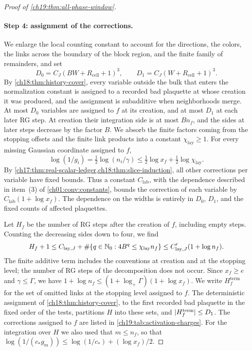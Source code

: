 \begin{proof}[Proof of \cref{ch19:thm:all-phase-window}]
\paragraph{Step 4: assignment of the corrections.}
We enlarge the local counting constant to account for the directions, the colors, the links across the boundary of the block region, and the finite family of remainders, and set
\[
 D_0=C_J(BW+R_{\mathrm{cell}}+1)^3,\qquad D_1=C_J(W+R_{\mathrm{cell}}+1)^3.
\]
By \cref{ch18:thm:history-cover}, every variable outside the bulk that enters the normalization constant is assigned to a recorded bad plaquette at whose creation it was produced, and the assignment is subadditive when neighborhoods merge. At most $D_0$ variables are assigned to $f$ at its creation, and at most $D_1$ at each later RG step. At creation their integration side is at most $Bn_f$, and the sides at later steps decrease by the factor $B$. We absorb the finite factors coming from the stopping offsets and the finite link products into a constant $\chi_{\mathrm{lay}}\ge1$. For every missing Gaussian coordinate assigned to $f$,
\begin{equation}\label{ch19:eq:label-log}
 \log(1/g_i)=\tfrac12\log(n_i/\gamma)\le\tfrac12\log x_f+\tfrac12\log\chi_{\mathrm{lay}}.
\end{equation}
By \cref{ch17:thm:real-scalar-ledger,ch18:thm:slice-induction}, all other corrections per variable have fixed bounds. Thus a constant $C_{\mathrm{lab}}$, with the dependence described in item~(3) of \cref{ch01:conv:constants}, bounds the correction of each variable by $C_{\mathrm{lab}}(1+\log x_f)$. The dependence on the widths is entirely in $D_0$, $D_1$, and the fixed counts of affected plaquettes.

Let $H_f$ be the number of RG steps after the creation of $f$, including empty steps. Counting the decreasing sides down to four, we find
\[
 H_f+1\le C_{\mathrm{lay},J}+\#\{q\in\mathbb N_0:4B^q\le\chi_{\mathrm{lay}}n_f\}\le C'_{\mathrm{lay},J}(1+\log n_f).
\]
The finite additive term includes the conventions at creation and at the stopping level; the number of RG steps of the decomposition does not occur. Since $x_f\ge e$ and $\gamma\le\Gamma$, we have $1+\log n_f\le(1+\log_+\Gamma)(1+\log x_f)$. We write $H_f^{\mathrm{term}}$ for the set of omitted links at the stopping level assigned to $f$. The deterministic assignment of \cref{ch18:thm:history-cover}, to the first recorded bad plaquette in the fixed order of the tests, partitions $H$ into these sets, and $\lvert H_f^{\mathrm{term}}\rvert\le D_1$. The corrections assigned to $f$ are listed in \cref{ch19:tab:activation-charges}. For the integration over $H$ we also used that $m\le n_f$, so that $\log(1/(c_*g_m))\le\log(1/c_*)+(\log x_f)/2$.


\end{proof}
